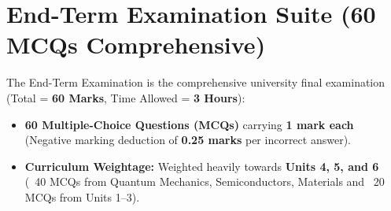 \documentclass[a4paper,11pt,oneside,openany]{book}
\begin{document}
\newpage

\newpage

\newpage

\newpage


\chapter{End-Term Examination Suite (60 MCQs Comprehensive)}
\label{chap:endterm}
\noindent
The End-Term Examination is the comprehensive university final examination (Total = \textbf{60 Marks}, Time Allowed = \textbf{3 Hours}):
\begin{itemize}[leftmargin=8mm]
    \item \textbf{60 Multiple-Choice Questions (MCQs)} carrying \textbf{1 mark each} (Negative marking deduction of \textbf{0.25 marks} per incorrect answer).
    \item \textbf{Curriculum Weightage:} Weighted heavily towards \textbf{Units 4, 5, and 6} (~40 MCQs from Quantum Mechanics, Semiconductors, Materials and ~20 MCQs from Units 1--3).
\end{itemize}

\newpage

\newpage

\newpage

\newpage

\end{document}

